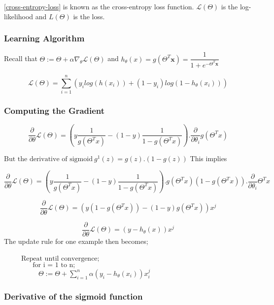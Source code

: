 \documentclass[12pt,a4paper,titlepage,landscape]{book}
\begin{document}
	\eqref{cross-entropy-loss} is known as the cross-entropy loss function. $\mathcal{L}(\Theta)$ is the log-likelihood and $L(\Theta)$ is the loss.
	
	\subsubsection{Learning Algorithm}
	Recall that $\Theta := \Theta + \alpha\nabla_\theta\mathcal{L}(\Theta)$ and $h_\theta(x) = g(\Theta^T\boldsymbol{x}) = \dfrac{1}{1+e^{-\Theta^T\boldsymbol{x}}}$
	
	$$
	\mathcal{L}(\Theta) = \sum_{i=1}^{n}\left(y_ilog(h(x_i)) + (1-y_i)log(1-h_\theta(x_i))\right)
	$$
	
	\subsubsection{Computing the Gradient}
	$$\dfrac{\partial}{\partial\theta}\mathcal{L}(\Theta) = \left(y\dfrac{1}{g(\Theta^Tx)} - (1-y)\dfrac{1}{1-g(\Theta^Tx)}\right).\dfrac{\partial}{\partial\theta_i}g(\Theta^Tx)$$
	
	$\text{But the derivative of sigmoid}~ g^1(z) = g(z).(1-g(z)) $ This implies
	
	$$\dfrac{\partial}{\partial\theta}\mathcal{L}(\Theta) = \left(y\dfrac{1}{g(\Theta^Tx)} - (1-y)\dfrac{1}{1-g(\Theta^Tx)}\right).g\left(\Theta^Tx\right)\left(1-g(\Theta^Tx)\right).\dfrac{\partial}{\partial\theta_i}\Theta^Tx$$
	
	$$\dfrac{\partial}{\partial\theta}\mathcal{L}(\Theta) = \left(y(1-g(\Theta^Tx)) - (1-y)g(\Theta^Tx)\right)x^j$$
	
	$$\dfrac{\partial}{\partial\theta}\mathcal{L}(\Theta) = (y-h_\theta(x))x^j$$
	The update rule for one example then becomes; \\\\
	${}\hspace{30pt} \text{Repeat until convergence;} $\\
	${}\hspace{50pt} \text{for i = 1 to n;} $\\
	${}\hspace{60pt} \Theta := \Theta + \sum_{i=1}^{n}\alpha (y_i - h_\theta(x_i))x_i^j$\\
	
	\subsubsection{Derivative of the sigmoid function}
	
\end{document}
